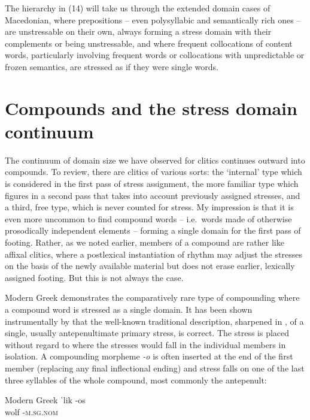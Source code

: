 \documentclass[output=paper,
modfonts
]{LSP/langsci}
\begin{document}
The hierarchy in (14) will take us through the extended domain cases of Macedonian, where prepositions -- even polysyllabic and semantically rich ones -- are unstressable on their own, always forming a stress domain with their complements or being unstressable, and where frequent collocations of content words, particularly involving frequent words or collocations with unpredictable or frozen semantics, are stressed as if they were single words. 

\section[Compounds and the stress domain continuum]{Compounds and the stress domain continuum}

The continuum of domain size we have observed for clitics continues outward into compounds. To review, there are clitics of various sorts: the ‘internal’ type which is considered in the first pass of stress assignment, the more familiar type which figures in a second pass that takes into account previously assigned stresses, and a third, free type, which is never counted for stress. My impression is that it is even more uncommon to find compound words -- i.e.\ words made of otherwise prosodically independent elements -- forming a single domain for the first pass of footing. Rather, as we noted earlier, members of a compound are rather like affixal clitics, where a postlexical instantiation of rhythm may adjust the stresses on the basis of the newly available material but does not erase earlier, lexically assigned footing. But this is not always the case.

Modern Greek demonstrates the comparatively rare type of compounding where a compound word is stressed as a single domain. It has been shown instrumentally by \citet{athanasopoulou2014} that the well-known traditional description, sharpened in \citet{ralli2013}, of a single, usually antepenultimate primary stress, is correct. The stress is placed without regard to where the stresses would fall in the individual members in isolation. A compounding morpheme \textit{{}-o} is often inserted at the end of the first member (replacing any final inflectional ending) and stress falls on one of the last three syllables of the whole compound, most commonly the antepenult:

\ea Modern Greek \citep{athanasopoulou2014,ralli2013}
	\ea \gll ˈlik \squish-os \\
 	wolf \squish-\textsc{m.sg.nom}\\
	
\end{document}

